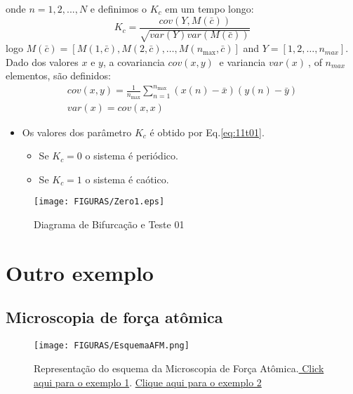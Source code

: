 \documentclass[12pt,aspectratio=169]{beamer}
\begin{document}
\begin{frame}
\noindent onde $n=1,2,...,N$ e definimos o \textit{$K_{c}$} em um tempo longo:
\begin{equation} \label{eq:11t01} 
K_{c} =\frac{cov\left(Y,M(\bar{c})\right)}{\sqrt{var(Y)var(M(\bar{c}))} }  
\end{equation} 
\noindent logo $M(\bar{c})=\left[M(1,\bar{c}),M(2,\bar{c}),\ldots ,M(n_{\max } ,\bar{c})\right]$ and  $Y=\left[1,2,\dots ,n_{max}\right]$.
Dado dos valores $x$ e $y$, a covariancia ${cov \left(x,y\right)\ }$ e variancia ${var \left(x\right)\ }$, of $n_{max}$ elementos, são definidos:
\begin{equation} \label{eq:012t01} 
\begin{array}{l} {cov\left(x,y\right)=\frac{1}{n_{\max } } \sum _{n=1}^{n_{\max } }\left(x\left(n\right)-\bar{x}\right)\left(y\left(n\right)-\bar{y}\right) } \\ {var\left(x\right)=cov\left(x,x\right)} \end{array} 
\end{equation}
\end{frame}

\begin{frame}{}
\begin{itemize}
    \item Os valores dos parâmetro $K_c$  é obtido por  Eq.\ref{eq:11t01}.
    \begin{itemize}
        \item Se $K_{c} = 0$  o sistema é periódico.
        \item Se $K_{c} = 1$ o sistema é caótico.
    \end{itemize}
\end{itemize}
\end{frame}
\begin{frame}{}

\begin{figure}[h]
\centering
\texttt{[image: FIGURAS/Zero1.eps]} 
\caption{Diagrama de Bifurcação e Teste 01}
\label{fig:03}
\end{figure}
\end{frame}



\section{Outro exemplo}
\subsection{Microscopia de força atômica}
\begin{frame}[fragile]
\begin{figure}[h]
    \centering
    \texttt{[image: FIGURAS/EsquemaAFM.png]}
    \caption{Representação do esquema da Microscopia de Força Atômica.\href{https://www.youtube.com/watch?v=8gCf1sEn0UU}{ Click aqui para o exemplo 1}. \href{https://www.youtube.com/watch?v=s6KqJS1GZNE}{Clique aqui para o exemplo 2}}
    \label{fig:esquemaAFM}
\end{figure}
\end{frame}
\end{document}

